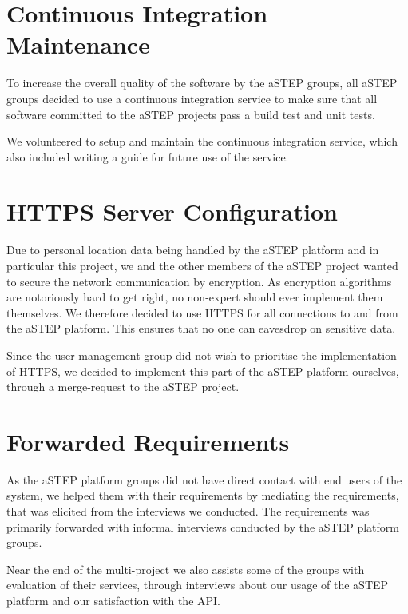 \section{Continuous Integration Maintenance}
To increase the overall quality of the software by the aSTEP groups, all aSTEP groups decided to use a continuous integration service to make sure that all software committed to the aSTEP projects pass a build test and unit tests.

We volunteered to setup and maintain the continuous integration service, which also included writing a guide for future use of the service.

\section{HTTPS Server Configuration}
Due to personal location data being handled by the aSTEP platform and in particular this project, we and the other members of the aSTEP project wanted to secure the network communication by encryption. As encryption algorithms are notoriously hard to get right, no non-expert should ever implement them themselves. We therefore decided to use HTTPS for all connections to and from the aSTEP platform. This ensures that no one can eavesdrop on sensitive data.

Since the user management group did not wish to prioritise the implementation of HTTPS, we decided to implement this part of the aSTEP platform ourselves, through a merge-request to the aSTEP project.

\section{Forwarded Requirements}

As the aSTEP platform groups did not have direct contact with end users of the system, we helped them with their requirements by mediating the requirements, that was elicited from the interviews we conducted. The requirements was primarily forwarded with informal interviews conducted by the aSTEP platform groups.

Near the end of the multi-project we also assists some of the groups with evaluation of their services, through interviews about our usage of the aSTEP platform and our satisfaction with the API.








